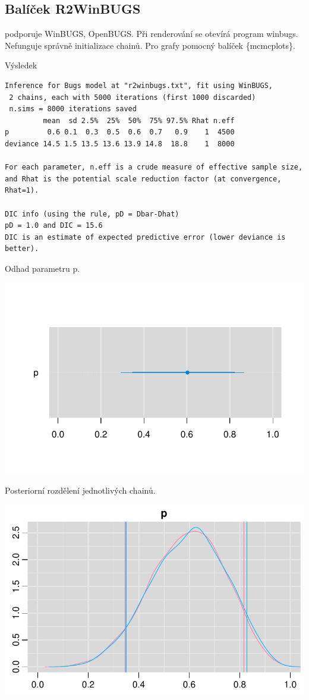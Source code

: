 \documentclass[
  11pt,
  a4paper]{report}
\begin{document}
\subsection{Balíček R2WinBUGS}\label{baluxedux10dek-r2winbugs}

podporuje WinBUGS, OpenBUGS. Při renderování se otevírá program winbugs.
Nefunguje správně initializace chainů. Pro grafy pomocný balíček
\{mcmcplots\}.

Výsledek

\begin{verbatim}
Inference for Bugs model at "r2winbugs.txt", fit using WinBUGS,
 2 chains, each with 5000 iterations (first 1000 discarded)
 n.sims = 8000 iterations saved
         mean  sd 2.5%  25%  50%  75% 97.5% Rhat n.eff
p         0.6 0.1  0.3  0.5  0.6  0.7   0.9    1  4500
deviance 14.5 1.5 13.5 13.6 13.9 14.8  18.8    1  8000

For each parameter, n.eff is a crude measure of effective sample size,
and Rhat is the potential scale reduction factor (at convergence, Rhat=1).

DIC info (using the rule, pD = Dbar-Dhat)
pD = 1.0 and DIC = 15.6
DIC is an estimate of expected predictive error (lower deviance is better).
\end{verbatim}

Odhad parametru p.

\includegraphics{index_files/figure-pdf/unnamed-chunk-6-1.pdf}

Posteriorní rozdělení jednotlivých chainů.

\includegraphics{index_files/figure-pdf/unnamed-chunk-7-1.pdf}
\end{document}
